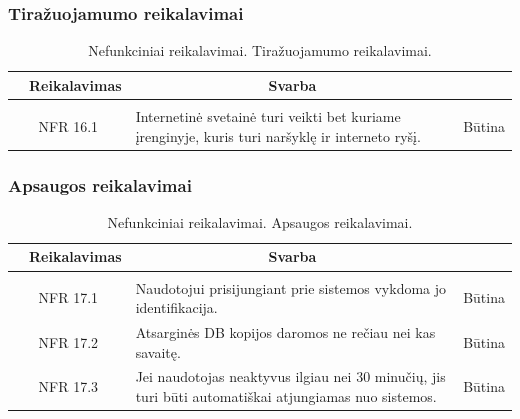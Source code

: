 \documentclass{VUMIFPSkursinis}
\begin{document}
\subsubsection{Tiražuojamumo reikalavimai}
\begin{table}[H]
	\caption{Nefunkciniai reikalavimai. Tiražuojamumo reikalavimai.}
	\begin{tabular}{|p{1cm}|p{1cm}|p{}|p{}|}
		\hline 
		\rowcolor{gray!50}
		\multicolumn{2}{|c|}{{\bfseries Kodas}}&
		\multicolumn{1}{c|}{{\bfseries Reikalavimas}}&
		\multicolumn{1}{c|}{{\bfseries Svarba}}\\
		\hline
		\rowcolor{lightgray}
		\multicolumn{4}{|c|}{Tiražuojamumo reikalavimai}\\		
		
		\hline
		\multicolumn{2}{|c|}{NFR 16.1}&
		{Internetinė svetainė turi veikti bet kuriame įrenginyje, kuris turi naršyklę ir interneto ryšį.
		}&		
		\multicolumn{1}{c|}{Būtina}\\
		
		\hline
	\end{tabular}		
\end{table}
\subsubsection{Apsaugos reikalavimai}
\begin{table}[H]
	\caption{Nefunkciniai reikalavimai. Apsaugos reikalavimai.}
	\begin{tabular}{|p{1cm}|p{1cm}|p{}|p{}|}
		\hline 
		\rowcolor{gray!50}
		\multicolumn{2}{|c|}{{\bfseries Kodas}}&
		\multicolumn{1}{c|}{{\bfseries Reikalavimas}}&
		\multicolumn{1}{c|}{{\bfseries Svarba}}\\
		\hline
		\rowcolor{lightgray}
		\multicolumn{4}{|c|}{Apsaugos reikalavimai}\\		
		
		\hline
		\multicolumn{2}{|c|}{NFR 17.1}&
		{Naudotojui prisijungiant prie sistemos vykdoma jo identifikacija.
		}&		
		\multicolumn{1}{c|}{Būtina}\\
		
		\hline
		\multicolumn{2}{|c|}{NFR 17.2}&
		{Atsarginės DB kopijos daromos ne rečiau nei kas savaitę.
		}&		
		\multicolumn{1}{c|}{Būtina}\\	
		
		\hline
		\multicolumn{2}{|c|}{NFR 17.3}&
		{Jei naudotojas neaktyvus ilgiau nei 30 minučių, jis turi būti automatiškai atjungiamas nuo sistemos.
		}&		
		\multicolumn{1}{c|}{Būtina}\\		
		
		\hline
	\end{tabular}		
\end{table}
\end{document}
